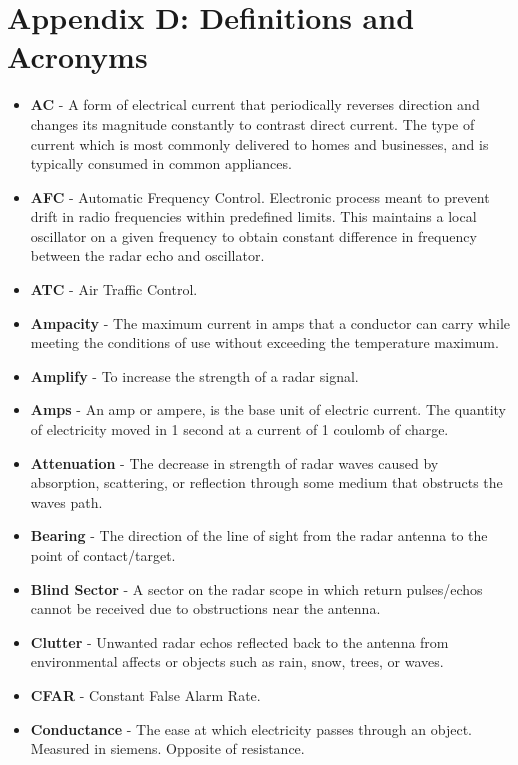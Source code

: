 \documentclass[12pt]{article}
\begin{document}
\pagebreak
\section{Appendix D: Definitions and Acronyms}
\begin{itemize}
    \item \textbf{AC} - A form of electrical current that periodically reverses direction and changes its magnitude constantly to contrast direct current. The type of current which is most commonly delivered to homes and businesses, and is typically consumed in common appliances. 
    \item \textbf{AFC} - Automatic Frequency Control. Electronic process meant to prevent drift in radio frequencies within predefined limits. This maintains a local oscillator on a given frequency to obtain constant difference in frequency between the radar echo and oscillator.
    \item \textbf{ATC} - Air Traffic Control.
    \item \textbf{Ampacity} - The maximum current in amps that a conductor can carry while meeting the conditions of use without exceeding the temperature maximum.
    \item \textbf{Amplify} - To increase the strength of a radar signal.
    \item \textbf{Amps} - An amp or ampere, is the base unit of electric current. The quantity of electricity moved in 1 second at a current of 1 coulomb of charge. 
    \item \textbf{Attenuation} - The decrease in strength of radar waves caused by absorption, scattering, or reflection through some medium that obstructs the waves path.
    \item \textbf{Bearing} - The direction of the line of sight from the radar antenna to the point of contact/target.
    \item \textbf{Blind Sector} - A sector on the radar scope in which return pulses/echos cannot be received due to obstructions near the antenna. 
    \item \textbf{Clutter} - Unwanted radar echos reflected back to the antenna from environmental affects or objects such as rain, snow, trees, or waves. 
    \item \textbf{CFAR} - Constant False Alarm Rate.
    \item \textbf{Conductance} - The ease at which electricity passes through an object. Measured in siemens. Opposite of resistance.

\end{itemize}
\end{document}

